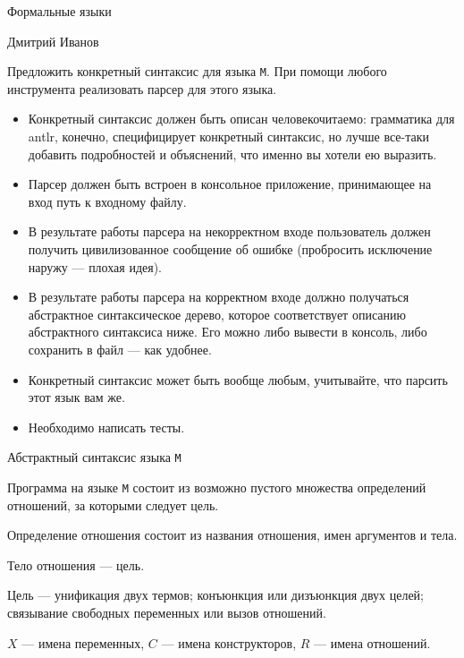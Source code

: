 \documentclass[12pt]{article}
\begin{document}
\begin{center}
{\LARGE Формальные языки}

\bigskip

{\Large Дмитрий Иванов}
\end{center}

\bigskip

Предложить конкретный синтаксис для языка \verb!M!. При помощи любого инструмента реализовать парсер для этого языка.

\begin{itemize}
  \item Конкретный синтаксис должен быть описан человекочитаемо: грамматика для antlr, конечно, специфицирует конкретный синтаксис, но лучше все-таки добавить подробностей и объяснений, что именно вы хотели ею выразить.
  \item Парсер должен быть встроен в консольное приложение, принимающее на вход путь к входному файлу.
  \item В результате работы парсера на некорректном входе пользователь должен получить цивилизованное сообщение об ошибке (пробросить исключение наружу --- плохая идея).
  \item В результате работы парсера на корректном входе должно получаться абстрактное синтаксическое дерево, которое соответствует описанию абстрактного синтаксиса ниже. Его можно либо вывести в консоль, либо сохранить в файл --- как удобнее.
  \item Конкретный синтаксис может быть вообще любым, учитывайте, что парсить этот язык вам же.
  \item Необходимо написать тесты.
\end{itemize}


\begin{center}
    \Large{Абстрактный синтаксис языка \verb!М!}
\end{center}

Программа на языке \verb!M! состоит из возможно пустого множества определений отношений, за которыми следует цель.

Определение отношения состоит из названия отношения, имен аргументов и тела.

Тело отношения --- цель.

Цель --- унификация двух термов; конъюнкция или дизъюнкция двух целей; связывание свободных переменных или вызов отношений.

$X$ --- имена переменных, $C$ --- имена конструкторов, $R$ --- имена отношений.
\end{document}
